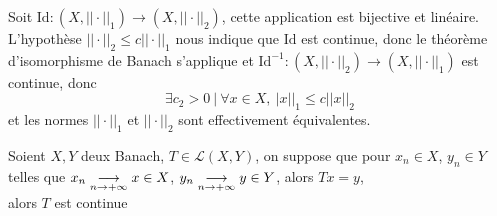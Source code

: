 \documentclass[a4paper,11pt, twoside]{article}
\begin{document}
\begin{Proof}
  Soit $\mathrm{Id}:(X,||\cdot||_1)\longrightarrow(X,||\cdot||_2)$, cette application est bijective et linéaire. L'hypothèse $||\cdot||_2\leqslant c||\cdot||_1$ nous indique que $\mathrm{Id}$ est continue, donc le théorème d'isomorphisme de Banach s'applique et $\mathrm{Id}^{-1}:(X,||\cdot||_2)\longrightarrow(X,||\cdot||_1)$ est continue, donc 
  $$\exists c_2>0\ |\ \forall x\in X,\ |x||_1\leqslant c||x||_2$$
  et les normes $||\cdot||_1$ et $||\cdot||_2$ sont effectivement équivalentes.
\end{Proof}



\begin{prop}
  Soient $X,Y$ deux Banach, $T\in\mathcal L(X,Y)$, on suppose que pour $x_n\in X$, $y_n\in Y$ telles que $x_n\underset{n\to+\infty}{\longrightarrow} x\in X$, $y_n\underset{n\to+\infty}{\longrightarrow} y\in Y$, alors $Tx=y$,\\

  alors $T$ est continue
\end{prop}
\end{document}
